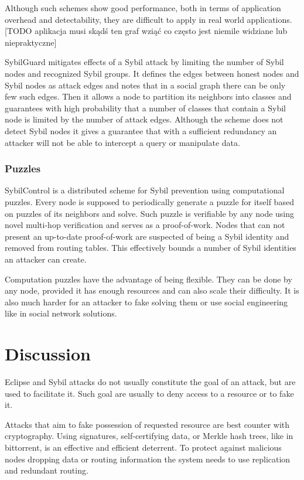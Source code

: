   Although such schemes show good performance, both in terms of application
  overhead and detectability, they are difficult to apply in real world
  applications.  [TODO aplikacja musi skądś ten graf wziąć co często jest
  niemile widziane lub niepraktyczne]

  SybilGuard \cite{hai06} mitigates effects of a Sybil attack by limiting the
  number of Sybil nodes and recognized Sybil groups. It defines the edges
  between honest nodes and Sybil nodes as attack edges and notes that in a
  social graph there can be only few such edges. Then it allows a node to
  partition its neighbors into classes and guarantees with high probability
  that a number of classes that contain a Sybil node is limited by the number of
  attack edges. Although the scheme does not detect Sybil nodes it gives a
  guarantee that with a sufficient redundancy an attacker will not be able to
  intercept a query or manipulate data.

  \subsubsection{Puzzles}
  SybilControl\cite{li12} is a distributed scheme for Sybil prevention using
  computational puzzles. Every node is supposed to periodically generate a
  puzzle for itself based on puzzles of its neighbors and solve. Such puzzle
  is verifiable by any node using novel multi-hop verification and serves as a
  proof-of-work. Nodes that can not present an up-to-date proof-of-work are
  suspected of being a Sybil identity and removed from routing tables. This
  effectively bounds a number of Sybil identities an attacker can create.

  Computation puzzles have the advantage of being flexible. They can be done by
  any node, provided it has enough resources and can also scale their
  difficulty. It is also much harder for an attacker to fake solving them or use
  social engineering like in social network solutions.

\section{Discussion}
  Eclipse and Sybil attacks do not usually constitute the goal of an attack, but
  are used to facilitate it. Such goal are usually to deny access to a resource
  or to fake it.

  Attacks that aim to fake possession of requested resource are best counter
  with cryptography. Using signatures, self-certifying data, or Merkle hash
  trees, like in bittorrent, is an effective and efficient deterrent.
  To protect against malicious nodes dropping data or routing information the
  system needs to use replication and redundant routing. 

